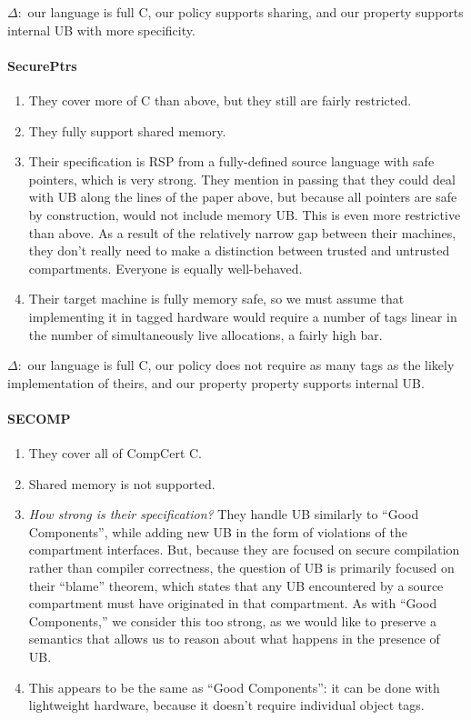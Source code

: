 \documentclass{article}
\begin{document}
\(\Delta:\) our language is full C, our policy supports sharing, and our property supports
internal UB with more specificity.

\paragraph{SecurePtrs}

\begin{enumerate}
\item They cover more of C than above, but they still are fairly restricted.
\item They fully support shared memory.
\item Their specification is RSP from a fully-defined source language with safe pointers,
  which is very strong. They mention in passing that they could deal with UB along the lines
  of the paper above, but because all pointers are safe by construction, would not include
  memory UB. This is even more restrictive than above. As a result of the relatively
  narrow gap between their machines, they don't really need to make a distinction
  between trusted and untrusted compartments. Everyone is equally well-behaved.
\item Their target machine is fully memory safe, so we must assume that implementing it in
  tagged hardware would require a number of tags linear in the number of simultaneously live
  allocations, a fairly high bar.
\end{enumerate}

\(\Delta:\) our language is full C, our policy does not require as many tags as the likely
implementation of theirs, and our property property supports internal UB.

\paragraph{SECOMP}

\begin{enumerate}
\item They cover all of CompCert C.
\item Shared memory is not supported.
\item {\em How strong is their specification?}
  They handle UB similarly to ``Good Components'', while adding new UB in the form of
  violations of the compartment interfaces. But, because they are focused on secure compilation
  rather than compiler correctness, the question of UB is primarily focused on their ``blame''
  theorem, which states that any UB encountered by a source compartment must have originated
  in that compartment. As with ``Good Components,'' we consider this too strong, as we would
  like to preserve a semantics that allows us to reason about what happens in the presence of UB.
\item This appears to be the same as ``Good Components'': it can be done with lightweight hardware,
  because it doesn't require individual object tags.
\end{enumerate}
\end{document}

